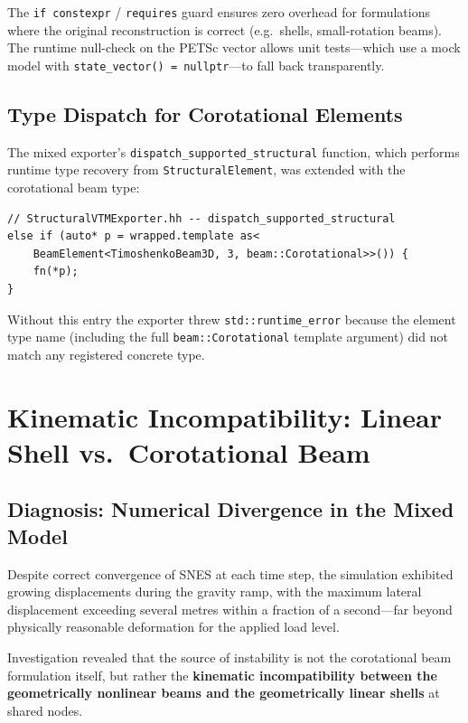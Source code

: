 The \texttt{if constexpr} / \texttt{requires} guard ensures zero overhead
for formulations where the original reconstruction is correct (e.g.\
shells, small-rotation beams).  The runtime null-check on the PETSc
vector allows unit tests---which use a mock model with
\texttt{state\_vector() = nullptr}---to fall back transparently.

\subsection{Type Dispatch for Corotational Elements}

The mixed exporter's \texttt{dispatch\_supported\_structural} function,
which performs runtime type recovery from \texttt{StructuralElement},
was extended with the corotational beam type:
\begin{lstlisting}
// StructuralVTMExporter.hh -- dispatch_supported_structural
else if (auto* p = wrapped.template as<
    BeamElement<TimoshenkoBeam3D, 3, beam::Corotational>>()) {
    fn(*p);
}
\end{lstlisting}

Without this entry the exporter threw
\texttt{std::runtime\_error} because the element type name (including
the full \texttt{beam::Corotational} template argument) did not match
any registered concrete type.


\section{Kinematic Incompatibility: Linear Shell vs.\ Corotational Beam}
\label{sec:kinematic-incompatibility}

\subsection{Diagnosis: Numerical Divergence in the Mixed Model}

Despite correct convergence of SNES at each time step, the simulation
exhibited growing displacements during the gravity ramp, with the
maximum lateral displacement exceeding several metres within a fraction
of a second---far beyond physically reasonable deformation for the
applied load level.

Investigation revealed that the source of instability is not the
corotational beam formulation itself, but rather the
\textbf{kinematic incompatibility between the geometrically nonlinear
beams and the geometrically linear shells} at shared nodes.

